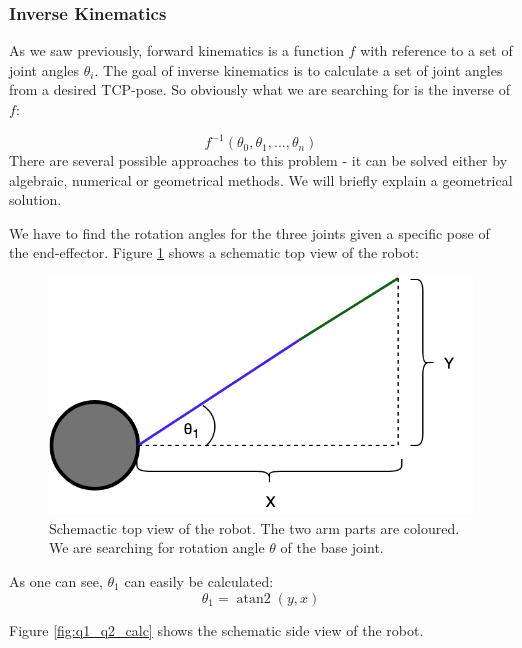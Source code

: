 \documentclass[conference]{IEEEtran}
\DeclareMathOperator{\atantwo}{atan2}
\begin{document}
\subsubsection{Inverse Kinematics}\label{sec:inversekinematics}
As we saw previously, forward kinematics is a function $f$ with reference to a set of joint angles $\theta_i$. The goal of inverse kinematics is to calculate a set of joint angles from a desired TCP-pose. So obviously what we are searching for is the inverse of $f$:

\begin{equation}
f^{-1}(\theta_0, \theta_1, ..., \theta_n)
\end{equation}
There are several possible approaches to this problem - it can be solved either by algebraic, numerical or geometrical methods. We will briefly explain a geometrical solution.

We have to find the rotation angles for the three joints given a specific pose of the end-effector.
Figure \ref{fig:yaw_calc} shows a schematic top view of the robot:

\begin{figure}[htbp]
	\centerline{\includegraphics[scale=0.3]{img/kin_yaw_arm_top_view.png}}
	\caption{Schemactic top view of the robot. The two arm parts are coloured. We are searching for rotation angle $\theta$ of the base joint.}
	\label{fig:yaw_calc}
\end{figure}

As one can see, $\theta_1$ can easily be calculated:
\begin{equation}
\theta_1 = \atantwo(y,x)
\end{equation}

Figure \ref{fig:q1_q2_calc} shows the schematic side view of the robot.
\end{document}
